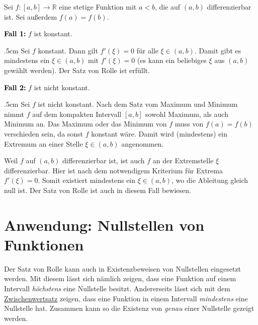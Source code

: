 \documentclass[fontsize=9pt,
               parskip=half-,
               DIV=14,
               listof=chapterentry,
               tocflat]{scrbook}
\newenvironment{indentblock}{\begin{adjustwidth}{.5cm}{}}{\end{adjustwidth}}
\newcommand{\proofcase}[2]{\textbf{\textcolor{Black}{Fall #1:}} #2}
\begin{document}
\begin{proof*}
Sei $f:[a,b]\to \mathbb {R} $ eine stetige Funktion mit $a<b$, die auf $(a,b)$ differenzierbar ist. Sei außerdem $f(a)=f(b)$.

\proofcase{1}{$f$ ist konstant.}
\begin{indentblock}
Sei $f$ konstant. Dann gilt $f'(\xi )=0$ für alle $\xi \in (a,b)$. Damit gibt es mindestens ein $\xi \in (a,b)$ mit $f'(\xi )=0$ (es kann ein beliebiges $\xi $ aus $(a,b)$ gewählt werden). Der Satz von Rolle ist erfüllt.

\end{indentblock}

\proofcase{2}{$f$ ist nicht konstant.}
\begin{indentblock}
Sei $f$ ist nicht konstant. Nach dem Satz vom Maximum und Minimum nimmt $f$ auf dem kompakten Intervall $[a,b]$ sowohl Maximum, als auch Minimum an. Das Maximum oder das Minimum von $f$ muss von $f(a)=f(b)$ verschieden sein, da sonst $f$ konstant wäre. Damit wird (mindestens) ein Extremum an einer Stelle $\xi \in (a,b)$ angenommen.

Weil $f$ auf $(a,b)$ differenzierbar ist, ist auch $f$ an der Extremstelle $\xi $ differenzierbar. Hier ist nach dem notwendigem Kriterium für Extrema $f'(\xi )=0$. Somit existiert mindestens ein $\xi \in (a,b)$, wo die Ableitung gleich null ist. Der Satz von Rolle ist auch in diesem Fall bewiesen.

\end{indentblock}

\end{proof*}

\section{Anwendung: Nullstellen von Funktionen}

Der Satz von Rolle kann auch in Existenzbeweisen von Nullstellen eingesetzt werden. Mit diesem lässt sich nämlich zeigen, dass eine Funktion auf einem Intervall \emph{höchstens} eine Nullstelle besitzt. Andererseits lässt sich mit dem \href{https://de.wikibooks.org/wiki/Mathe\_für\_Nicht-Freaks:\_Zwischenwertsatz}
{Zwischenwertsatz} zeigen, dass eine Funktion in einem Intervall \emph{mindestens} eine Nullstelle hat. Zusammen kann so die Existenz von \emph{genau} einer Nullstelle gezeigt werden.
\end{document}
